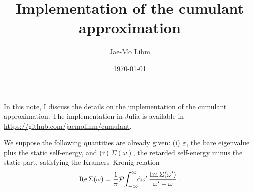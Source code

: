 \documentclass[
    reprint, onecolumn,
    aps,prx,11pt,tightenlines,amsmath,amssymb,
    longbibliography,superscriptaddress,citeautoscript,
    preprintnumbers,nofootinbib]{revtex4-2}
\begin{document}
\title{Implementation of the cumulant approximation}

\author{Jae-Mo Lihm}

\date{\today}



\maketitle
In this note, I discuss the details on the implementation of the cumulant approximation.
%
The implementation in Julia is available in \url{https://github.com/jaemolihm/cumulant}.


We suppose the following quantities are already given:
(i) $\varepsilon$, the bare eigenvalue plus the static self-energy, and
(ii) $\Sigma(\omega)$, the retarded self-energy minus the static part, satisfying the Kramers--Kronig relation
\begin{equation} \label{eq:KK}
    \operatorname{Re} \Sigma(\omega) = \frac{1}{\pi} {\mathcal{P}} \!\int_{-\infty}^{\infty}\!\! {\mathrm{d}}\omega' \, \frac{\operatorname{Im} \Sigma(\omega')}{\omega' - \omega} \,.
\end{equation}
\end{document}
